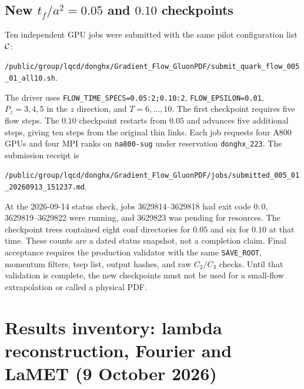 \documentclass[11pt]{article}
\numberwithin{equation}{section}
\begin{document}
\subsection{New \(t_f/a^2=0.05\) and \(0.10\) checkpoints}

Ten independent GPU jobs were submitted with the same pilot configuration
list \({\cal C}\):
\begin{center}
\nolinkurl{/public/group/lqcd/donghx/Gradient_Flow_GluonPDF/submit_quark_flow_005_01_all10.sh}.
\end{center}
The driver uses \texttt{FLOW\_TIME\_SPECS=0.05:2;0.10:2},
\texttt{FLOW\_EPSILON=0.01}, \(P_z=3,4,5\) in the \(z\) direction, and
\(T=6,\ldots,10\).  The first checkpoint requires five flow steps.  The
\(0.10\) checkpoint restarts from \(0.05\) and advances five additional
steps, giving ten steps from the original thin links.  Each job requests four
A800 GPUs and four MPI ranks on \texttt{na800-sug} under reservation
\texttt{donghx\_223}.  The submission receipt is
\begin{center}
\nolinkurl{/public/group/lqcd/donghx/Gradient_Flow_GluonPDF/jobs/submitted_005_01_20260913_151237.md}.
\end{center}

At the 2026-09-14 status check, jobs 3629814--3629818 had exit code \(0:0\),
3629819--3629822 were running, and 3629823 was pending for resources.  The
checkpoint trees contained eight conf directories for \(0.05\) and six for
\(0.10\) at that time.  These counts are a dated status snapshot, not a
completion claim.  Final acceptance requires the production validator with
the same \texttt{SAVE\_ROOT}, momentum filters, tsep list, output hashes, and
raw \(C_2/C_3\) checks.  Until that validation is complete, the new checkpoints
must not be used for a small-flow extrapolation or called a physical PDF.

\clearpage
\section{Results inventory: lambda reconstruction, Fourier and LaMET
(9 October 2026)}
\label{sec:results-october}
\end{document}

